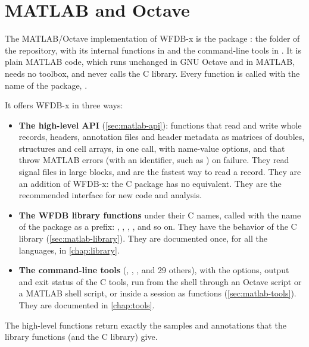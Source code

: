\chapter{MATLAB and Octave}
\label{chap:matlab}

The MATLAB/Octave implementation of WFDB-x is the package : the folder
 of the repository, with its internal functions in
 and the command-line tools in . It is plain
MATLAB code, which runs unchanged in GNU Octave and in MATLAB, needs no toolbox, and never
calls the C library. Every function is called with the name of the package,
.

It offers WFDB-x in three ways:
\begin{itemize}
\item \textbf{The high-level API} (\cref{sec:matlab-api}): functions that read and write
  whole records, headers, annotation files and header metadata as matrices of doubles,
  structures and cell arrays, in one call, with name-value options, and that throw MATLAB
  errors (with an identifier, such as ) on failure. They read
  signal files in large blocks, and are the fastest way to read a record. They are an
  addition of WFDB-x: the C package has no equivalent. They are the recommended interface
  for new code and analysis.
\item \textbf{The WFDB library functions} under their C names, called with the name of
  the package as a prefix: , ,
  , , and so on. They have the
  behavior of the C library (\cref{sec:matlab-library}). They are documented once, for
  all the languages, in \cref{chap:library}.
\item \textbf{The command-line tools} (, , ,
   and 29 others), with the options, output and exit status of the C tools,
  run from the shell through an Octave script or a MATLAB shell script, or inside a
  session as functions (\cref{sec:matlab-tools}). They are documented in
  \cref{chap:tools}.
\end{itemize}
The high-level functions return exactly the samples and annotations that the library
functions (and the C library) give.


